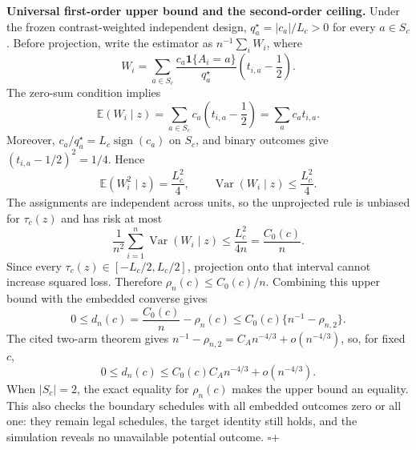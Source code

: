 \textbf{Universal first-order upper bound and the second-order ceiling.}
Under the frozen contrast-weighted independent design, \(q_a^\star=|c_a|/L_c>0\) for every \(a\in S_c\). Before projection, write the estimator as \(n^{-1}\sum_i W_i\), where
\[
 W_i=\sum_{a\in S_c}
 \frac{c_a\mathbf 1\{A_i=a\}}{q_a^\star}
 \left(t_{i,a}-\frac12\right).
\]
The zero-sum condition implies
\[
 \mathbb E(W_i\mid z)
 =\sum_{a\in S_c}c_a\left(t_{i,a}-\frac12\right)
 =\sum_a c_at_{i,a}.
\]
Moreover, \(c_a/q_a^\star=L_c\operatorname{sign}(c_a)\) on \(S_c\), and binary outcomes give \((t_{i,a}-1/2)^2=1/4\). Hence
\[
 \mathbb E(W_i^2\mid z)=\frac{L_c^2}{4},
 \qquad
 \operatorname{Var}(W_i\mid z)\leq\frac{L_c^2}{4}.
\]
The assignments are independent across units, so the unprojected rule is unbiased for \(\tau_c(z)\) and has risk at most
\[
 \frac1{n^2}\sum_{i=1}^n\operatorname{Var}(W_i\mid z)
 \leq\frac{L_c^2}{4n}=\frac{C_0(c)}n.
\]
Since every \(\tau_c(z)\in[-L_c/2,L_c/2]\), projection onto that interval cannot increase squared loss. Therefore \(\rho_n(c)\leq C_0(c)/n\). Combining this upper bound with the embedded converse gives
\[
 0\leq d_n(c)=\frac{C_0(c)}n-\rho_n(c)
 \leq C_0(c)\{n^{-1}-\rho_{n,2}\}.
\]
The cited two-arm theorem gives
\(n^{-1}-\rho_{n,2}=C_A n^{-4/3}+o(n^{-4/3})\), so, for fixed \(c\),
\[
 0\leq d_n(c)
 \leq C_0(c)C_A n^{-4/3}+o(n^{-4/3}).
\]
When \(|S_c|=2\), the exact equality for \(\rho_n(c)\) makes the upper bound an equality. This also checks the boundary schedules with all embedded outcomes zero or all one: they remain legal schedules, the target identity still holds, and the simulation reveals no unavailable potential outcome. \(\square\)+